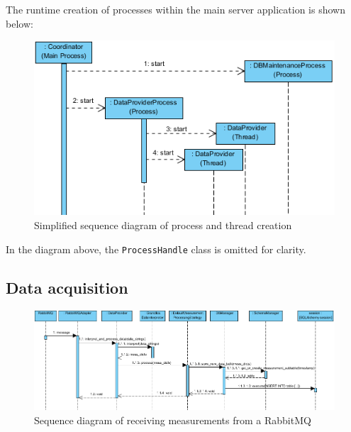 The runtime creation of processes within the main server application is shown below:
\begin{figure}[H]
    \centering
    \includegraphics[width=\textwidth]{figures/seq_diagram_init}
    \caption{Simplified sequence diagram of process and thread creation}
\end{figure}

In the diagram above, the \texttt{ProcessHandle} class is omitted for clarity.


\newpage
\subsection{Data acquisition}
\begin{figure}[H]
    \centering
    \includegraphics[width=0.9\textheight, angle=90]{figures/data_acq_seq_diagram}
    \caption{Sequence diagram of receiving measurements from a RabbitMQ}
\end{figure}


